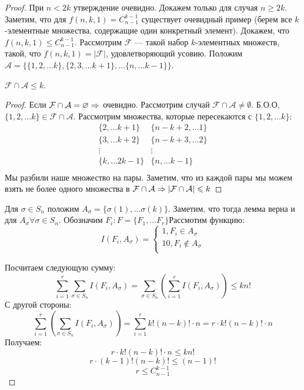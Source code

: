 \begin{proof}
    При \(n < 2k\) утверждение очевидно. Докажем только для случая \(n \ge 2k\). Заметим, что для \(f(n, k, 1) = C_{n - 1}^{k - 1}\) существует очевидный пример (берем все \(k\)-элементные множества, содержащие один конкретный элемент). Докажем, что \(f(n, k, 1) \le C_{n - 1}^{k - 1}\). Рассмотрим \(\mathcal{F}\) --- такой набор \(k\)-элементных множеств, такой, что \(f(n, k, 1) = |\mathcal{F}|\), удовлетворяющий усовию. Положим \(\mathcal{A} = \{\{1, 2, \dots k\}, \{2, 3, \dots k + 1\}, \dots \{n, \dots k - 1\}\}\).

    \begin{lemma}
        \(\mathcal{F} \cap \mathcal{A} \le k\).
    \end{lemma}
    \begin{proof}
        Если \(\mathcal{F} \cap \mathcal{A} = \varnothing \Rightarrow\) очевидно. Рассмотрим случай \(\mathcal{F} \cap \mathcal{A} \ne \emptyset\). Б.О.О, \(\{1, 2, \dots k\} \in \mathcal{F} \cap \mathcal{A}\). Рассмотрим множества, которые пересекаются с \(\{1, 2, \dots k\}\):
        \[\begin{array}{c|c}
            \{2, \dots k + 1\} & \{n - k + 2, \dots 1\}\\
            \hline
            \{3, \dots k + 2\} & \{n - k + 3, \dots 2\}\\
            \hline
            \vdots & \vdots \\
            \hline
            \{k, \dots 2k - 1\} & \{n, \dots k - 1\}\\
        \end{array}\]
        Мы разбили наше множество на пары. Заметим, что из каждой пары мы можем взять не более одного множества в \(\mathcal{F} \cap \mathcal{A} \Rightarrow |\mathcal{F} \cap \mathcal{A}| \leqslant k\)
    \end{proof}
    Для \(\sigma \in S_n\) положим \(A_\sigma = \{\sigma(1), \dots \sigma(k)\}\). Заметим, что тогда лемма верна и для \(A_\sigma \forall \sigma \in S_n\). Обозначим \(F_i: F = \{F_1, \dots F_r\}\)Рассмотим функцию:
    \[I(F_i, A_\sigma) = \left\{\begin{array}{l}
        1, F_i \in A_\sigma \\
        10, F_i \notin A_\sigma \\
    \end{array}\right.\]

    Посчитаем следующую сумму:
    \[\sum_{i = 1}^r \sum_{\sigma \in S_n} I(F_i, A_\sigma) = \sum_{\sigma \in S_n}\left( \sum_{i = 1}^r I(F_i, A_\sigma) \right) \le kn!\]
    С другой стороны:
    \[\sum_{i = 1}^r\left( \sum_{\sigma \in S_n} I(F_i, A_\sigma)\right) = \sum_{i = 1}^r k!(n - k)!\cdot n = r\cdot k!(n - k)!\cdot n\]
    Получаем:
    \[r\cdot k!(n - k)!\cdot n \le kn!\]
    \[r\cdot (k - 1)!(n - k)! \le (n - 1)!\]
    \[r \le C_{n - 1}^{k - 1}\]
\end{proof}

